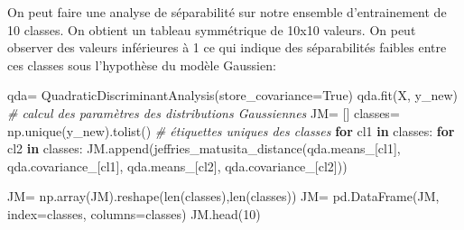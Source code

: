 \documentclass[
]{article}
\newenvironment{Shaded}{}{}
\newcommand{\BuiltInTok}[1]{\textcolor[rgb]{0.00,0.50,0.00}{#1}}
\newcommand{\CommentTok}[1]{\textcolor[rgb]{0.38,0.63,0.69}{\textit{#1}}}
\newcommand{\ControlFlowTok}[1]{\textcolor[rgb]{0.00,0.44,0.13}{\textbf{#1}}}
\newcommand{\DecValTok}[1]{\textcolor[rgb]{0.25,0.63,0.44}{#1}}
\newcommand{\KeywordTok}[1]{\textcolor[rgb]{0.00,0.44,0.13}{\textbf{#1}}}
\newcommand{\NormalTok}[1]{#1}
\newcommand{\OperatorTok}[1]{\textcolor[rgb]{0.40,0.40,0.40}{#1}}
\newcommand{\VariableTok}[1]{\textcolor[rgb]{0.10,0.09,0.49}{#1}}
\begin{document}
On peut faire une analyse de séparabilité sur notre ensemble
d'entrainement de 10 classes. On obtient un tableau symmétrique de 10x10
valeurs. On peut observer des valeurs inférieures à 1 ce qui indique des
séparabilités faibles entre ces classes sous l'hypothèse du modèle
Gaussien:

\label{16c78db6}
\label{cb15}
\begin{Shaded}
\begin{Highlighting}[]
\NormalTok{qda}\OperatorTok{=}\NormalTok{ QuadraticDiscriminantAnalysis(store\_covariance}\OperatorTok{=}\VariableTok{True}\NormalTok{)}
\NormalTok{qda.fit(X, y\_new) }\CommentTok{\# calcul des paramètres des distributions Gaussiennes}
\NormalTok{JM}\OperatorTok{=}\NormalTok{ []}
\NormalTok{classes}\OperatorTok{=}\NormalTok{ np.unique(y\_new).tolist() }\CommentTok{\# étiquettes uniques des classes}
\ControlFlowTok{for}\NormalTok{ cl1 }\KeywordTok{in}\NormalTok{ classes:}
  \ControlFlowTok{for}\NormalTok{ cl2 }\KeywordTok{in}\NormalTok{ classes:}
\NormalTok{    JM.append(jeffries\_matusita\_distance(qda.means\_[cl1], qda.covariance\_[cl1], qda.means\_[cl2], qda.covariance\_[cl2]))}

\NormalTok{JM}\OperatorTok{=}\NormalTok{ np.array(JM).reshape(}\BuiltInTok{len}\NormalTok{(classes),}\BuiltInTok{len}\NormalTok{(classes))}
\NormalTok{JM}\OperatorTok{=}\NormalTok{ pd.DataFrame(JM, index}\OperatorTok{=}\NormalTok{classes, columns}\OperatorTok{=}\NormalTok{classes)}
\NormalTok{JM.head(}\DecValTok{10}\NormalTok{)}
\end{Highlighting}
\end{Shaded}
\end{document}
